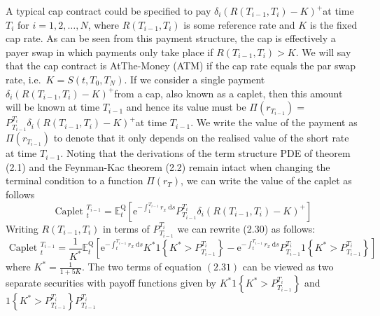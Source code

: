 \documentclass[12pt,twoside]{reedthesis}
\begin{document}
A typical cap contract could be specified to pay \(\delta_{i}\left(R\left(T_{i-1}, T_{i}\right)-K\right)^{+}\)at time \(T_{i}\) for \(i=1,2, \ldots, N\), where \(R\left(T_{i-1}, T_{i}\right)\) is some reference rate and \(K\) is the fixed cap rate. As can be seen from this payment structure, the cap is effectively a payer swap in which payments only take place if \(R\left(T_{i-1}, T_{i}\right)>K\). We will say that the cap contract is AtThe-Money (ATM) if the cap rate equals the par swap rate, i.e.~\(K=S\left(t, T_{0}, T_{N}\right)\). If we consider a single payment \(\delta_{i}\left(R\left(T_{i-1}, T_{i}\right)-K\right)^{+}\)from a cap, also known as a caplet, then this amount will be known at time \(T_{i-1}\) and hence its value must be \(\Pi\left(r_{T_{i-1}}\right)=\) \(P_{T_{i-1}}^{T_{i}} \delta_{i}\left(R\left(T_{i-1}, T_{i}\right)-K\right)^{+}\)at time \(T_{i-1}\). We write the value of the payment as \(\Pi\left(r_{T_{i-1}}\right)\) to denote that it only depends on the realised value of the short rate at time \(T_{i-1}\). Noting that the derivations of the term structure PDE of theorem (2.1) and the Feynman-Kac theorem (2.2) remain intact when changing the terminal condition to a function \(\Pi\left(r_{T}\right)\), we can write the value of the caplet as follows
\[
\text { Caplet }_{t}^{T_{i-1}}=\mathbb{E}_{t}^{\mathrm{Q}}\left[\mathrm{e}^{-\int_{1}^{T_{i-1}} r_{x} \mathrm{~d} s} P_{T_{i-1}}^{T_{i}} \delta_{i}\left(R\left(T_{i-1}, T_{i}\right)-K\right)^{+}\right]
\]
Writing \(R\left(T_{i-1}, T_{i}\right)\) in terms of \(P_{T_{i-1}}^{T_{i}}\) we can rewrite (2.30) as follows:
\[
\text { Caplet }_{t}^{T_{i-1}}=\frac{1}{K^{*}} \mathbb{E}_{t}^{\mathrm{Q}}\left[\mathrm{e}^{-\int_{t}^{T_{i-1}} r_{x} \mathrm{~d} s} K^{*} 1\left\{K^{*}>P_{T_{i-1}}^{T_{i}}\right\}-\mathrm{e}^{-\int_{t}^{T_{i-1}} r_{x} \mathrm{~d} s} P_{T_{i-1}}^{T_{i}} 1\left\{K^{*}>P_{T_{i-1}}^{T_{i}}\right\}\right]
\]
where \(K^{*}=\frac{1}{1+5 K}\). The two terms of equation \((2.31)\) can be viewed as two separate securities with payoff functions given by \(K^{*} 1\left\{K^{*}>P_{T_{i-1}}^{T_{i}}\right\}\) and \(1\left\{K^{*}>P_{T_{i-1}}^{T_{i}}\right\} P_{T_{i-1}}^{T_{i}}\)
\end{document}
